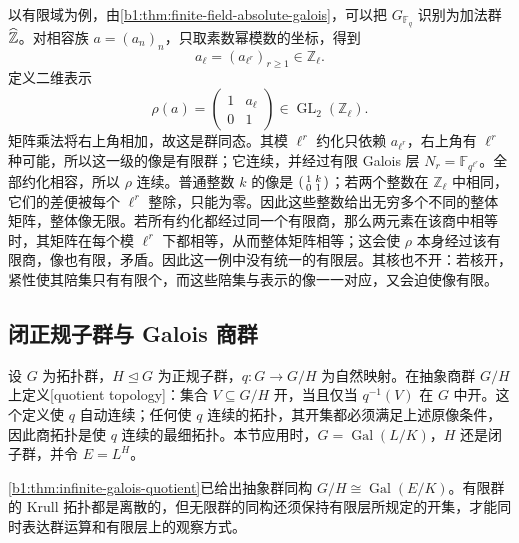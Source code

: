 \ProseParagraphBreak
以有限域为例，由\cref{b1:thm:finite-field-absolute-galois}，可以把 \(G_{\mathbb F_q}\) 识别为加法群 \(\widehat{\vphantom{Z}\mathbb Z}\)。对相容族 \(a=(a_n)_n\)，只取素数幂模数的坐标，得到
\[
	a_\ell=(a_{\ell^r})_{r\geq1}\in\mathbb Z_\ell.
\]
定义二维表示
\[
	\rho(a)=\begin{pmatrix}1&a_\ell\\0&1\end{pmatrix}
	\in\operatorname{GL}_2(\mathbb Z_\ell).
\]
矩阵乘法将右上角相加，故这是群同态。其模 \(\ell^r\) 约化只依赖 \(a_{\ell^r}\)，右上角有 \(\ell^r\) 种可能，所以这一级的像是有限群；它连续，并经过有限 Galois 层 \(N_r=\mathbb F_{q^{\ell^r}}\)。全部约化相容，所以 \(\rho\) 连续。普通整数 \(k\) 的像是 \(\begin{psmallmatrix}1&k\\0&1\end{psmallmatrix}\)；若两个整数在 \(\mathbb Z_\ell\) 中相同，它们的差便被每个 \(\ell^r\) 整除，只能为零。因此这些整数给出无穷多个不同的整体矩阵，整体像无限。若所有约化都经过同一个有限商，那么两元素在该商中相等时，其矩阵在每个模 \(\ell^r\) 下都相等，从而整体矩阵相等；这会使 \(\rho\) 本身经过该有限商，像也有限，矛盾。因此这一例中没有统一的有限层。其核也不开：若核开，紧性使其陪集只有有限个，而这些陪集与表示的像一一对应，又会迫使像有限。

\subsection{闭正规子群与 Galois 商群}
\label{b1:subsec:2205:04}
设 \(G\) 为拓扑群，\(H\trianglelefteq G\) 为正规子群，\(q:G\rightarrow G/H\) 为自然映射。在抽象商群 \(G/H\) 上定义[quotient topology]：集合 \(V\subseteq G/H\) 开，当且仅当 \(q^{-1}(V)\) 在 \(G\) 中开。这个定义使 \(q\) 自动连续；任何使 \(q\) 连续的拓扑，其开集都必须满足上述原像条件，因此商拓扑是使 \(q\) 连续的最细拓扑。本节应用时，\(G=\operatorname{Gal}(L/K)\)，\(H\) 还是闭子群，并令 \(E=L^H\)。

\ProseParagraphBreak
\cref{b1:thm:infinite-galois-quotient}已给出抽象群同构 \(G/H\cong\operatorname{Gal}(E/K)\)。有限群的 Krull 拓扑都是离散的，但无限群的同构还须保持有限层所规定的开集，才能同时表达群运算和有限层上的观察方式。

